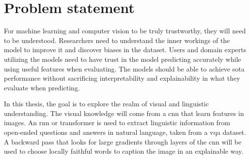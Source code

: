 \begin{comment}
In a short and precise way, state what your research is about in this thesis. It can be in the form of a (set of) research questions, goals/aims, or objectives (or a mix) - but it should clearly state what the problems or challenges you are addressing.

Alternatively, one can state a research hypothesis, but if so, it should follow the rules of what a hypothesis is. A hypothesis is a statement that introduces a research question and proposes an expected result. It is an integral part of the scientific method that forms the basis of scientific experiments. Therefore, you need to be careful and thorough when building your hypothesis, following the “rules”.
\end{comment}

\section{Problem statement}
    \label{sec:1_2_problem_statement}

For machine learning and computer vision to be truly trustworthy, they will need to be understood. Researchers need to understand the inner workings of the model to improve it and discover biases in the dataset. Users and domain experts utilizing the models need to have trust in the model predicting accurately while using useful features when evaluating. The models should be able to achieve \gls{sota} performance without sacrificing interpretability and explainability in what they evaluate when predicting. 

In this thesis, the goal is to explore the realm of visual and linguistic understanding.
The visual knowledge will come from a \gls{cnn} that learn features in images. An \gls{rnn} \cite{rumelhartLearningRepresentationsBackpropagating1986, choLearningPhraseRepresentations2014, sutskeverSequenceSequenceLearning2014, bahdanauNeuralMachineTranslation2016} or transformer is used to extract linguistic information from open-ended questions and answers in natural language, taken from a \gls{vqa} dataset. A backward pass that looks for large gradients through layers of the \gls{cnn} will be used to choose locally faithful words to caption the image in an explainable way. 


